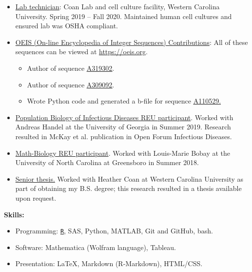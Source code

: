 \documentclass[11pt]{article}
\begin{document}
\begin{itemize}[noitemsep]
\item \ul{Lab technician}: Coan Lab and cell culture facility, Western Carolina University. Spring 2019 -- Fall 2020. Maintained human cell cultures and ensured lab was OSHA compliant.
\item \ul{OEIS (On-line Encyclopedia of Integer Sequences) Contributions}: All of these sequences can be viewed at \url{https://oeis.org}.
	\begin{itemize}[noitemsep]
		\item Author of sequence \href{https://oeis.org/A319302}{\ul{A319302}}.
		\item Author of sequence \href{https://oeis.org/A309092}{\ul{A309092}}.
		\item Wrote Python code and generated a b-file for sequence \href{https://oeis.org/A110529}{\ul{A110529}.}
	\end{itemize}
\item \ul{Population Biology of Infectious Diseases REU participant}. Worked with Andreas Handel at the University of Georgia in Summer 2019. Research resulted in McKay et al. publication in Open Forum Infectious Diseases.
\item \underline{Math-Biology REU participant}. Worked with Louis-Marie Bobay at the University of North Carolina at Greensboro in Summer 2018.
\item \ul{Senior thesis.} Worked with Heather Coan at Western Carolina University as part of obtaining my B.S. degree; this research resulted in a thesis available upon request.
\end{itemize}

\vspace{0.2in}
\textbf{Skills:}

\begin{itemize}[noitemsep]
\item Programming: \ul{\texttt{R}}, SAS, Python, MATLAB, Git and GitHub, bash.
\item Software: Mathematica (Wolfram language), Tableau.
\item Presentation: \LaTeX{}, Markdown (R-Markdown), HTML/CSS.
\end{itemize}
\end{document}
